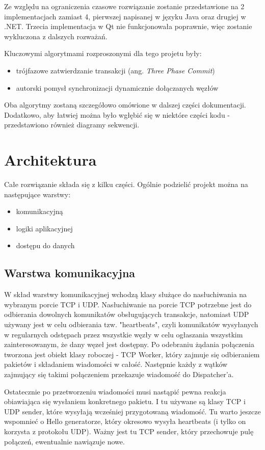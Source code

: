 \documentclass[a4paper, oneside, 11pt]{report}
\begin{document}
Ze względu na ograniczenia czasowe rozwiązanie zostanie przedstawione na 2 implementacjach zamiast 4, pierwszej napisanej w języku Java oraz drugiej w .NET. Trzecia implementacja w Qt nie funkcjonowała poprawnie, więc zostanie wykluczona z dalszych rozważań.

Kluczowymi algorytmami rozproszonymi dla tego projetu były:
\begin{itemize}
	\item trójfazowe zatwierdzanie transakcji (ang. \emph{Three Phase Commit})
	\item autorski pomysł synchronizacji dynamicznie dołączanych węzłów
\end{itemize}
Oba algorytmy zostaną szczegółowo omówione w dalszej części dokumentacji. Dodatkowo, aby łatwiej można było wgłębić się w niektóre części kodu - przedstawiono również diagramy sekwencji.
\chapter{Architektura}
Całe rozwiązanie składa się z kilku części. Ogólnie podzielić projekt można na następujące warstwy:
\begin{itemize}
	\item komunikacyjną
	\item logiki aplikacyjnej
	\item dostępu do danych
\end{itemize}
\section{Warstwa komunikacyjna}
W skład warstwy komunikacyjnej wchodzą klasy służące do nasłuchiwania na wybranym porcie TCP i UDP. Nasłuchiwanie na porcie TCP potrzebne jest do odbierania dowolnych komunikatów obsługujących transakcje, natomiast UDP używany jest w celu odbierania tzw. "heartbeats", czyli komunikatów wysyłanych w regularnych odstępach przez wszystkie węzły w celu ogłaszania wszystkim zainteresowanym, że dany węzeł jest dostępny. Po odebraniu żądania połączenia tworzona jest obiekt klasy roboczej - TCP Worker, który zajmuje się odbieraniem pakietów i składaniem wiadomości w całość. Następnie każdy z wątków zajmujący się takimi połączeniem przekazuje wiadomość do Dispatcher'a.

Ostatecznie po przetworzeniu wiadomości musi nastąpić pewna reakcja obiawiająca się wysłaniem konkretnego pakietu. I tu używane są klasy TCP i UDP sender, które wysyłają wcześniej przygotowaną wiadomość. Tu warto jeszcze wspomnieć o Hello generatorze, który okresowo wysyła heartbeats (i tylko on korzysta z protokołu UDP). Ważny jest tu TCP sender, który przechowuje pulę połączeń, ewentualnie nawiązuje nowe.
\end{document}
